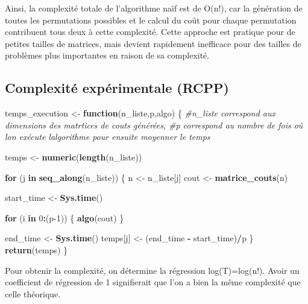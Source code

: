 \documentclass[
]{article}
\newenvironment{Shaded}{\begin{snugshade}}{\end{snugshade}}
\newcommand{\CommentTok}[1]{\textcolor[rgb]{0.56,0.35,0.01}{\textit{#1}}}
\newcommand{\ControlFlowTok}[1]{\textcolor[rgb]{0.13,0.29,0.53}{\textbf{#1}}}
\newcommand{\DecValTok}[1]{\textcolor[rgb]{0.00,0.00,0.81}{#1}}
\newcommand{\FunctionTok}[1]{\textcolor[rgb]{0.13,0.29,0.53}{\textbf{#1}}}
\newcommand{\NormalTok}[1]{#1}
\newcommand{\OtherTok}[1]{\textcolor[rgb]{0.56,0.35,0.01}{#1}}
\newcommand{\SpecialCharTok}[1]{\textcolor[rgb]{0.81,0.36,0.00}{\textbf{#1}}}
\begin{document}
Ainsi, la complexité totale de l'algorithme naïf est de O(n!), car la
génération de toutes les permutations possibles et le calcul du coût
pour chaque permutation contribuent tous deux à cette complexité. Cette
approche est pratique pour de petites tailles de matrices, mais devient
rapidement inefficace pour des tailles de problèmes plus importantes en
raison de sa complexité.

\hypertarget{complexituxe9-expuxe9rimentale-rcpp}{%
\subsection{Complexité expérimentale
(RCPP)}\label{complexituxe9-expuxe9rimentale-rcpp}}

\begin{Shaded}
\begin{Highlighting}[]
\NormalTok{temps\_execution }\OtherTok{\textless{}{-}} \ControlFlowTok{function}\NormalTok{(n\_liste,p,algo) \{}
  \CommentTok{\#n\_liste correspond aux dimensions des matrtices de couts générées,}
  \CommentTok{\#p correspond au nombre de fois oû l\textquotesingle{}on exécute l\textquotesingle{}algorithme pour ensuite moyenner le temps}

\NormalTok{  temps }\OtherTok{\textless{}{-}} \FunctionTok{numeric}\NormalTok{(}\FunctionTok{length}\NormalTok{(n\_liste))}
  
  \ControlFlowTok{for}\NormalTok{ (j }\ControlFlowTok{in} \FunctionTok{seq\_along}\NormalTok{(n\_liste)) \{}
\NormalTok{    n }\OtherTok{\textless{}{-}}\NormalTok{ n\_liste[j]}
\NormalTok{    cout }\OtherTok{\textless{}{-}} \FunctionTok{matrice\_couts}\NormalTok{(n)}
    
\NormalTok{    start\_time }\OtherTok{\textless{}{-}} \FunctionTok{Sys.time}\NormalTok{()}
    
    \ControlFlowTok{for}\NormalTok{ (i }\ControlFlowTok{in} \DecValTok{0}\SpecialCharTok{:}\NormalTok{(p}\DecValTok{{-}1}\NormalTok{)) \{}
    \FunctionTok{algo}\NormalTok{(cout)}
\NormalTok{    \}}
    
\NormalTok{    end\_time }\OtherTok{\textless{}{-}} \FunctionTok{Sys.time}\NormalTok{()}
\NormalTok{    temps[j] }\OtherTok{\textless{}{-}}\NormalTok{ (end\_time }\SpecialCharTok{{-}}\NormalTok{ start\_time)}\SpecialCharTok{/}\NormalTok{p}
\NormalTok{  \}}
  \FunctionTok{return}\NormalTok{(temps)}
\NormalTok{\}}
\end{Highlighting}
\end{Shaded}

Pour obtenir la complexité, on détermine la régression log(T)=log(n!).
Avoir un coefficient de régression de 1 signifierait que l'on a bien la
même complexité que celle théorique.
\end{document}
